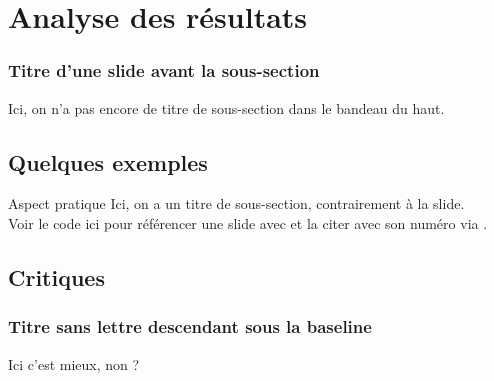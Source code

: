 \section[Analyse des résultats]{Analyse des résultats}

\begin{frame}
\frametitle{Titre d'une slide avant la sous-section}
Ici, on n’a pas encore de titre de sous-section dans le bandeau du haut.\\
\end{frame}


\subsection{Quelques exemples}

\begin{frame}{Aspect pratique}
Ici, on a un titre de sous-section, contrairement à la slide.\\[1.5cm]
Voir le code ici pour référencer une slide avec et la citer avec son numéro via .
\end{frame}

\subsection{Critiques}

\begin{frame}
\frametitle{Titre sans lettre descendant sous la baseline}
Ici c'est mieux, non ?
\end{frame}

